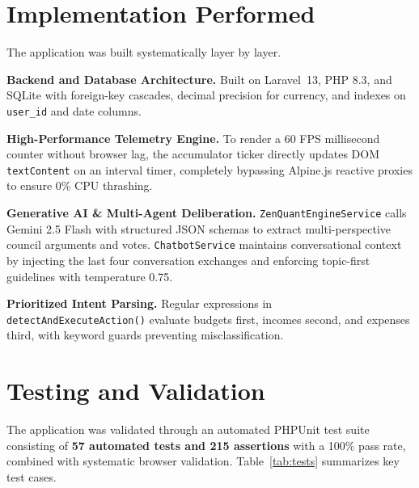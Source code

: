 \documentclass[12pt,a4paper]{report}
\newcommand{\LV}{Laravel~13}
\begin{document}
\section{Implementation Performed}\label{s44}

The application was built systematically layer by layer.

\textbf{Backend and Database Architecture.} Built on \LV{}, PHP 8.3, and SQLite with foreign-key cascades, decimal precision for currency, and indexes on \texttt{user\_id} and date columns.

\textbf{High-Performance Telemetry Engine.} To render a 60 FPS millisecond counter without browser lag, the accumulator ticker directly updates DOM \texttt{textContent} on an interval timer, completely bypassing Alpine.js reactive proxies to ensure 0\% CPU thrashing.

\textbf{Generative AI \& Multi-Agent Deliberation.} \texttt{ZenQuantEngineService} calls Gemini 2.5 Flash with structured JSON schemas to extract multi-perspective council arguments and votes. \texttt{ChatbotService} maintains conversational context by injecting the last four conversation exchanges and enforcing topic-first guidelines with temperature 0.75.

\textbf{Prioritized Intent Parsing.} Regular expressions in \texttt{detectAndExecuteAction()} evaluate budgets first, incomes second, and expenses third, with keyword guards preventing misclassification.


\section{Testing and Validation}\label{s441}

The application was validated through an automated PHPUnit test suite consisting of \textbf{57 automated tests and 215 assertions} with a 100\% pass rate, combined with systematic browser validation. Table~\ref{tab:tests} summarizes key test cases.
\end{document}
